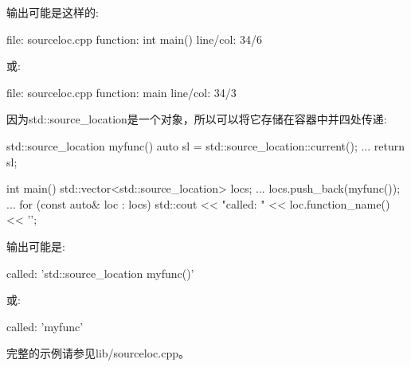 输出可能是这样的:

\begin{shell}
file:     sourceloc.cpp
function: int main()
line/col: 34/6
\end{shell}

或:

\begin{shell}
file:     sourceloc.cpp
function: main
line/col: 34/3
\end{shell}

因为std::source\_location是一个对象，所以可以将它存储在容器中并四处传递:

\begin{cpp}
std::source_location myfunc()
{
	auto sl = std::source_location::current();
	...
	return sl;
}

int main()
{
	std::vector<std::source_location> locs;
	...
	locs.push_back(myfunc());
	...
	for (const auto& loc : locs) {
		std::cout << "called: " << loc.function_name() << '\n';
	}
}
\end{cpp}

输出可能是:

\begin{shell}
called: ’std::source_location myfunc()’
\end{shell}

或:

\begin{shell}
called: ’myfunc’
\end{shell}

完整的示例请参见lib/sourceloc.cpp。


















